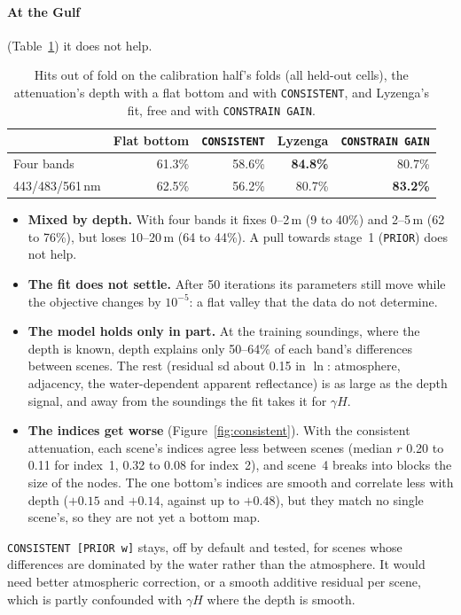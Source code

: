 \documentclass[11pt]{article}
\numberwithin{equation}{section}
\newcommand{\code}[1]{\texttt{#1}}
\begin{document}
\paragraph{At the Gulf} (Table~\ref{tab:consistent}) it does not help.
\begin{table}[h]
\centering
\caption{Hits out of fold on the calibration half's folds (all held-out cells), the attenuation's
depth with a flat bottom and with \code{CONSISTENT}, and Lyzenga's fit, free and with
\code{CONSTRAIN GAIN}.}
\label{tab:consistent}
\begin{tabular}{lrrrr}
\toprule
 & Flat bottom & \code{CONSISTENT} & Lyzenga & \code{CONSTRAIN GAIN} \\
\midrule
Four bands & 61.3\% & 58.6\% & \textbf{84.8\%} & 80.7\% \\
443/483/561\,nm & 62.5\% & 56.2\% & 80.7\% & \textbf{83.2\%} \\
\bottomrule
\end{tabular}
\end{table}
\begin{itemize}
\item \textbf{Mixed by depth.} With four bands it fixes 0--2\,m (9 to 40\%) and 2--5\,m (62 to 76\%),
  but loses 10--20\,m (64 to 44\%). A pull towards stage~1 (\code{PRIOR}) does not help.
\item \textbf{The fit does not settle.} After 50 iterations its parameters still move while the
  objective changes by $10^{-5}$: a flat valley that the data do not determine.
\item \textbf{The model holds only in part.} At the training soundings, where the depth is known,
  depth explains only 50--64\% of each band's differences between scenes. The rest (residual sd
  about 0.15 in $\ln$: atmosphere, adjacency, the water-dependent apparent reflectance) is as large
  as the depth signal, and away from the soundings the fit takes it for $\gamma H$.
\item \textbf{The indices get worse} (Figure~\ref{fig:consistent}). With the consistent attenuation, each
  scene's indices agree less between scenes (median $r$ 0.20 to 0.11 for index~1, 0.32 to 0.08 for
  index~2), and scene~4 breaks into blocks the size of the nodes. The one bottom's indices are
  smooth and correlate less with depth ($+0.15$ and $+0.14$, against up to $+0.48$), but they
  match no single scene's, so they are not yet a bottom map.
\end{itemize}
\code{CONSISTENT [PRIOR w]} stays, off by default and tested, for scenes whose differences are
dominated by the water rather than the atmosphere. It would need better atmospheric correction,
or a smooth additive residual per scene, which is partly confounded with $\gamma H$ where the depth
is smooth.
\end{document}
